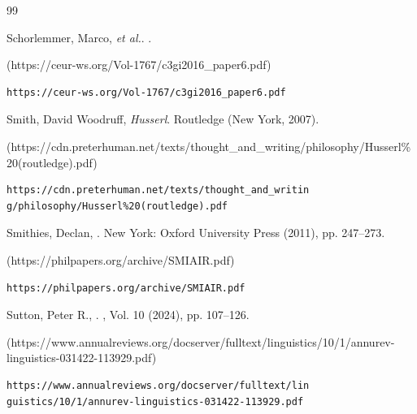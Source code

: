 \begin{thebibliography}{99}
{\condenlargepage{4em}
%



\begin{bItem}[Schorlemmeretal]
Schorlemmer, Marco, \textit{et al.}.  
.  
%
\begin{boxurl}(https://ceur-ws.org/Vol-1767/c3gi2016_paper6.pdf)
\begin{lstlisting}
https://ceur-ws.org/Vol-1767/c3gi2016_paper6.pdf
\end{lstlisting}
\end{boxurl}\end{bItem}





\begin{bItem}[DavidWoodruffSmith]
Smith, David Woodruff,  
\textit{Husserl}.
Routledge (New York, 2007).
%
\begin{boxurl}(https://cdn.preterhuman.net/texts/thought_and_writing/philosophy/Husserl\%20(routledge).pdf)
\begin{lstlisting}
https://cdn.preterhuman.net/texts/thought_and_writin
g/philosophy/Husserl%20(routledge).pdf
\end{lstlisting}
\end{boxurl}\end{bItem}



\begin{bItem}[Smithies]
Smithies, Declan,
.
 New York: 
Oxford University Press (2011), pp. 247--273.
%
\begin{boxurl}(https://philpapers.org/archive/SMIAIR.pdf)
\begin{lstlisting}
https://philpapers.org/archive/SMIAIR.pdf
\end{lstlisting}
\end{boxurl}\end{bItem}



\begin{bItem}[PeterRSutton]
Sutton, Peter R.,
.
, 
Vol. 10 (2024), pp. 107--126.
%
\begin{boxurl}(https://www.annualreviews.org/docserver/fulltext/linguistics/10/1/annurev-linguistics-031422-113929.pdf)
\begin{lstlisting}
https://www.annualreviews.org/docserver/fulltext/lin
guistics/10/1/annurev-linguistics-031422-113929.pdf
\end{lstlisting}
\end{boxurl}\end{bItem}





}
\end{thebibliography}
